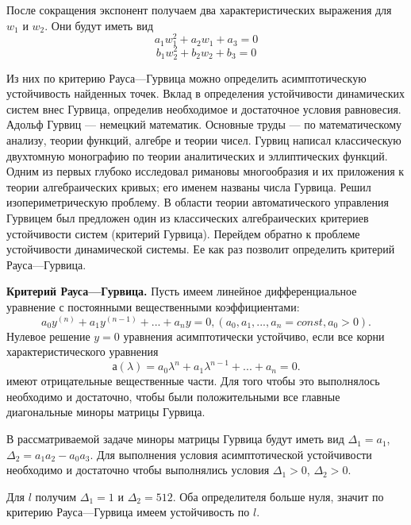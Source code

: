 \documentclass[a4paper,14pt]{extarticle}
\begin{document}
После сокращения экспонент получаем два характеристических выражения для $w_1$ и $w_2$.
Они будут иметь вид
\begin{equation*} 
     a_1 w_1^2	+ a_2 w_1 + a_3= 0
\end{equation*}
\begin{equation*}
	b_1 w_2^2	+ b_2 w_2 + b_3= 0
\end{equation*}

Из них по критерию Рауса—Гурвица можно определить асимптотическую устойчивость найденных точек. Вклад в определения устойчивости динамических систем внес Гурвица, определив необходимое и достаточное условия равновесия. Адольф Гурвиц --- немецкий математик. Основные труды — по математическому анализу, теории функций, алгебре и теории чисел. Гурвиц написал классическую двухтомную монографию по теории аналитических и эллиптических функций. Одним из первых глубоко исследовал римановы многообразия и их приложения к теории алгебраических кривых; его именем названы числа Гурвица. Решил изопериметрическую проблему. В области теории автоматического управления Гурвицем был предложен один из классических алгебраических критериев устойчивости систем (критерий Гурвица). Перейдем обратно к проблеме устойчивости динамической системы. Ее как раз позволит определить критерий Рауса—Гурвица.

\textbf{Критерий Рауса—Гурвица.}
Пусть имеем линейное дифференциальное уравнение с постоянными вещественными коэффициентами:
\begin{equation*}
	a_0 y^{(n)} + a_1 y^{(n - 1)} + ... + a_n y  = 0, (a_0, a_1, ..., a_n = const, a_0 > 0).
\end{equation*}
Нулевое решение $y = 0$ уравнения асимптотически устойчиво, если все корни характеристического уравнения 
\begin{equation*}
	а(\lambda) = a_0 \lambda^n + a_1 \lambda^{n - 1} + ... + a_n = 0.
\end{equation*}
имеют отрицательные вещественные части. Для того чтобы это выполнялось необходимо и достаточно, чтобы были положительными все главные диагональные миноры матрицы Гурвица.

В рассматриваемой задаче миноры матрицы Гурвица будут иметь вид $\Delta_1 = a_1$, $\Delta_2 = a_1 a_2 - a_0 a_3$. Для выполнения условия асимптотической устойчивости необходимо и достаточно чтобы выполнялись условия $\Delta_1 > 0$, $\Delta_2 > 0$.

Для $l$ получим $\Delta_1 = 1$ и  $\Delta_2 = 512$. Оба определителя больше нуля, значит по критерию Рауса—Гурвица имеем устойчивость по $l$.
\end{document}
